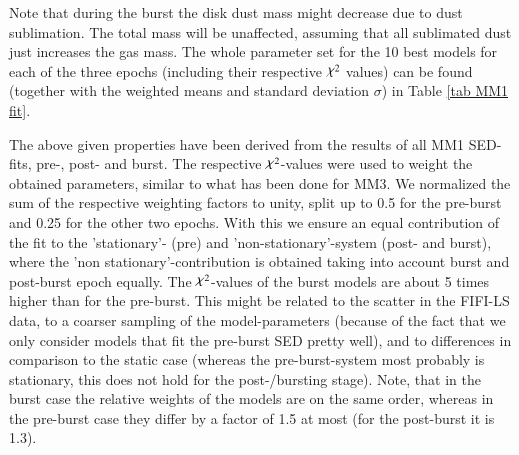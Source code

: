 Note that during the burst the disk dust mass might decrease due to dust sublimation. The total mass will be unaffected, assuming that all sublimated dust just increases the gas mass. %
The whole parameter set for the 10 best models for each of the three epochs (including their respective $\goodchi^2$ values) can be found (together with the weighted means and standard deviation $\sigma$) in Table \ref{tab MM1 fit}.

The above given properties have been derived from the results of all MM1 SED-fits, pre-, post- and burst. The respective $\goodchi^2$-values were used to weight the obtained parameters, similar to what has been done for MM3. We normalized the sum of the respective weighting factors to unity, 
split up to 0.5 for the pre-burst and 0.25 for the other two epochs.
With this we ensure an equal contribution of the fit to the 'stationary'- (pre) and 'non-stationary'-system (post- and burst), where the 'non stationary'-contribution is obtained taking into account burst and post-burst epoch equally.
The $\goodchi^2$-values of the burst models are about 5 times higher than for the pre-burst. This might be related to the scatter in the FIFI-LS data, to a coarser sampling of the model-parameters (because of the fact that we only consider models that fit the pre-burst SED pretty well), and to differences in comparison to the static case (whereas the pre-burst-system most probably is stationary, this does not hold for the post-/bursting stage).
Note, that in the burst case the relative weights of the models are on the same order, whereas in the pre-burst case they differ by a factor of 1.5 at most (for the post-burst it is 1.3).

